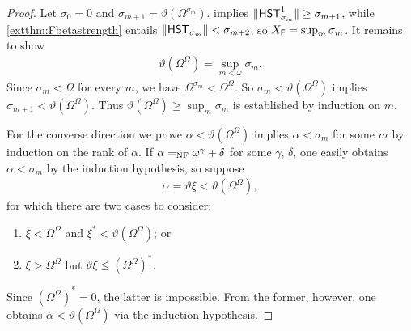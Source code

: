 \documentclass[UKenglish,cleveref,DIV=12]{scrartcl}
\theoremstyle{definition}
\theoremstyle{definition}
\begin{document}
\begin{proof}
Let $\sigma_0=0$ and $\sigma_{m+1}=\vartheta(\Omega^{\sigma_m})$.  implies $\lVert{\mathsf{HST}_{\sigma_m}^1}\rVert\ge\sigma_{m+1}$, while \cref{extthm:Fbetastrength} entails $\lVert{\mathsf{HST}_{\sigma_m}}\rVert<\sigma_{m+2}$, so $X_{\mathsf{F}}=\sup_m\sigma_m$. It remains to show
\begin{align*}
 \vartheta(\Omega^\Omega)=\sup_{m<\omega}\sigma_m.
\end{align*}
Since ${\sigma_m}<\Omega$ for every $m$, we have $\Omega^{\sigma_m}<\Omega^\Omega$.
So $\sigma_m<\vartheta(\Omega^\Omega)$ implies
$\sigma_{m+1}<\vartheta(\Omega^\Omega)$. Thus
$\vartheta(\Omega^\Omega)\ge\sup_m\sigma_m$ is established by induction on $m$.

For the converse direction we prove $\alpha<\vartheta(\Omega^\Omega)$ implies
$\alpha<\sigma_m$ for some $m$ by induction on the rank of $\alpha$. If
$\alpha=_{\mathrm{NF}}\omega^\gamma+\delta$ for some $\gamma$, $\delta$, one easily obtains
$\alpha<\sigma_m$ by the induction hypothesis, so suppose
\begin{align*}
 \alpha=\vartheta\xi<\vartheta(\Omega^\Omega),
\end{align*}
for which there are two cases to consider:
\begin{enumerate}
 \item $\xi<\Omega^\Omega$ and $\xi^*<\vartheta(\Omega^\Omega)$; or
 \item $\xi>\Omega^\Omega$ but $\vartheta\xi\le(\Omega^\Omega)^*$.
\end{enumerate}
Since $(\Omega^\Omega)^*=0$, the latter is impossible. From the former, however, one obtains $\alpha<\vartheta(\Omega^\Omega)$ via the induction
hypothesis.
\end{proof}
\end{document}
